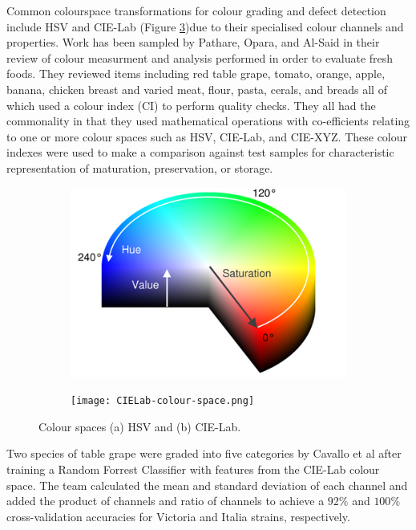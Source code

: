 \documentclass[fleqn,twoside,12pt]{report}
\begin{document}
Common colourspace transformations for colour grading and defect detection include HSV and CIE-Lab (Figure \ref{fig:colour-space})due to their specialised colour channels and properties. Work has been sampled by Pathare, Opara, and Al-Said \cite{pathare} in their review of colour measurment and analysis performed in order to evaluate fresh foods. They reviewed items including red table grape, tomato, orange, apple, banana, chicken breast and varied meat, flour, pasta, cerals, and breads all of which used a colour index (CI) to perform quality checks. They all had the commonality in that they used mathematical operations with co-efficients relating to one or more colour spaces such as HSV, CIE-Lab, and CIE-XYZ. These colour indexes were used to make a comparison against test samples for characteristic representation of maturation, preservation, or storage. 

\begin{figure}[h]
	\centering
	\begin{subfigure}{.5\textwidth}
		\centering
		\includegraphics[width=.7\linewidth]{hue_sat.png}
		\caption{}
		\label{fig:HSV}
	\end{subfigure}%
	\begin{subfigure}{.5\textwidth}
		\centering
		\texttt{[image: CIELab-colour-space.png]}
		\caption{}
		\label{fig:Lab}
	\end{subfigure}%
	\caption{Colour spaces (a) HSV and (b) CIE-Lab.}
	\label{fig:colour-space}
\end{figure}

Two species of table grape were graded into five categories by Cavallo et al \cite{cavallo} after training a Random Forrest Classifier with features from the CIE-Lab colour space. The team calculated the mean and standard deviation of each channel and added the product of channels and ratio of channels to achieve a $92\%$ and $100\%$ cross-validation accuracies for Victoria and Italia strains, respectively.
\end{document}
